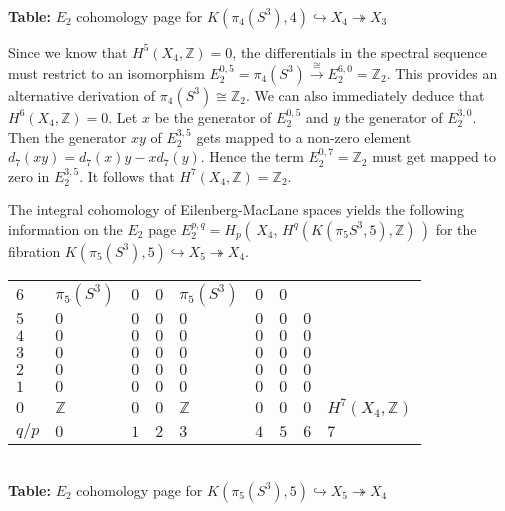 \documentclass[a4paper,11pt]{report}
\begin{document}
{{\begin{center}
\\[2mm]
\textbf{Table: }$E_2$ cohomology page for $K(\pi_4(S^3),4) \hookrightarrow X_4 \twoheadrightarrow X_3$\end{center}

 Since we know that $H^5(X_4,\mathbb Z) =0$, the differentials in the spectral sequence must restrict to an isomorphism $E_2^{0,5}=\pi_4(S^3) \stackrel{\cong}{\longrightarrow} E_2^{6,0}=\mathbb Z_2$. This provides an alternative derivation of $\pi_4(S^3) \cong \mathbb Z_2$. We can also immediately deduce that $H^6(X_4,\mathbb Z)=0$. Let $x$ be the generator of $E_2^{0,5}$ and $y$ the generator of $E_2^{3,0}$. Then the generator $xy$ of $E_2^{3,5}$ gets mapped to a non-zero element $d_7(xy)=d_7(x)y -xd_7(y)$. Hence the term $E_2^{0,7}=\mathbb Z_2$ must get mapped to zero in $E_2^{3,5}$. It follows that $H^7(X_4,\mathbb Z)=\mathbb Z_2$. 

The integral cohomology of Eilenberg-MacLane spaces yields the following
information on the $E_2$ page $E_2^{p,q}=H_p(\,X_4,\,H^q(K(\pi_5S^3,5),\mathbb Z)\,)$ for the fibration $K(\pi_5(S^3),5) \hookrightarrow X_5 \twoheadrightarrow X_4$. \begin{center}
\begin{tabular}{l|llllllll} $6$ &
 $\pi_5(S^3)$ &
 $0$ &
 $0$ &
 $\pi_5(S^3)$ &
 $0$ &
 $0$ &
 &
 \\
 $5$ &
 $0$ &
 $0$ &
 $0$ &
 $0$ &
 $0$ &
 $0$ &
 $0$ &
 \\
 $4$ &
 $0$ &
 $0$ &
 $0$ &
 $0$ &
 $0$ &
 $0$ &
 $0$ &
 \\
 $3$ &
 $0$ &
 $0$ &
 $0$ &
 $0$ &
 $0$ &
 $0$ &
 $0$ &
 \\
 $2$ &
 $0$ &
 $0$ &
 $0$ &
 $0$ &
 $0$ &
 $0$ &
 $0$ &
 \\
 $1$ &
 $0$ &
 $0$ &
 $0$ &
 $0$ &
 $0$ &
 $0$ &
 $0$ &
 \\
 $0$ &
 $\mathbb Z$ &
 $0$ &
 $0$ &
 $\mathbb Z$ &
 $0$ &
 $0$ &
 $0$ &
 $H^7(X_4,\mathbb Z)$ \\
 $q/p$ &
 $0$ &
 $1$ &
 $2$ &
 $3$ &
 $4$ &
 $5$ &
 $6$ &
 $7$ \\
\end{tabular}\\[2mm]
\textbf{Table: }$E_2$ cohomology page for $K(\pi_5(S^3),5) \hookrightarrow X_5 \twoheadrightarrow X_4$\end{center}

}}
\end{document}
